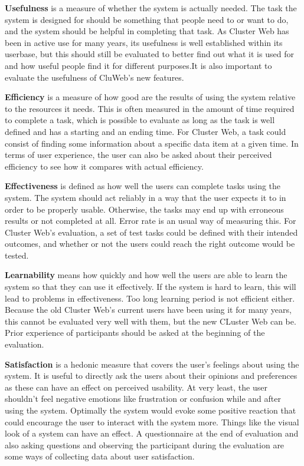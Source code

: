 \textbf{Usefulness} is a measure of whether the system is actually needed. The task the system is designed for should be something that people need to or want to do, and the system should be helpful in completing that task. As Cluster Web has been in active use for many years, its usefulness is well established within its userbase, but this should still be evaluated to better find out what it is used for and how useful people find it for different purposes.It is also important to evaluate the usefulness of CluWeb's new features.

\textbf{Efficiency} is a measure of how good are the results of using the system relative to the resources it needs. This is often measured in the amount of time required to complete a task, which is possible to evaluate as long as the task is well defined and has a starting and an ending time. For Cluster Web, a task could  consist of finding some information about a specific data item at a given time. In terms of user experience, the user can also be asked about their perceived efficiency to see how it compares with actual efficiency.

\textbf{Effectiveness} is defined as how well the users can complete tasks using the system. The system should act reliably in a way that the user expects it to in order to be properly usable. Otherwise, the tasks may end up with erroneous results or not completed at all. Error rate is an usual way of measuring this. For Cluster Web's evaluation, a set of test tasks could be defined with their intended outcomes, and whether or not the users could reach the right outcome would be tested.

\textbf{Learnability} means how quickly and how well the users are able to learn the system so that they can use it effectively. If the system is hard to learn, this will lead to problems in effectiveness. Too long learning period is not efficient either. Because the old Cluster Web's current users have been using it for many years, this cannot be evaluated very well with them, but the new CLuster Web can be. Prior experience of participants should be asked at the beginning of the evaluation.

\textbf{Satisfaction} is a hedonic measure that covers the user's feelings about using the system. It is useful to directly ask the users about their opinions and preferences as these can have an effect on perceived usability. At very least, the user shouldn't feel negative emotions like frustration or confusion while and after using the system. Optimally the system would evoke some positive reaction that could encourage the user to interact with the system more. Things like the visual look of a system can have an effect. A questionnaire at the end of evaluation and also asking questions and observing the participant during the evaluation are some ways of collecting data about user satisfaction.

